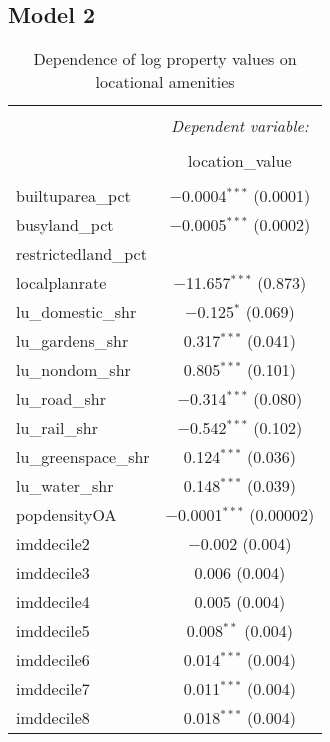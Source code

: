 \documentclass{article}\usepackage[]{graphicx}\usepackage[]{color}
\begin{document}
\subsection{Model 2}\label{section:model 2}

\begin{table}[!htbp] \centering 
  \caption{Dependence of log property values on locational amenities } 
  \label{} 
\small 
\begin{tabular}{@{\extracolsep{5pt}}lc} 
\\[-1.8ex]\hline 
\hline \\[-1.8ex] 
 & \multicolumn{1}{c}{\textit{Dependent variable:}} \\ 
\cline{2-2} 
\\[-1.8ex] & location\_value \\ 
\hline \\[-1.8ex] 
 builtuparea\_pct & $-$0.0004$^{***}$ (0.0001) \\ 
  busyland\_pct & $-$0.0005$^{***}$ (0.0002) \\ 
  restrictedland\_pct &  \\ 
  localplanrate & $-$11.657$^{***}$ (0.873) \\ 
  lu\_domestic\_shr & $-$0.125$^{*}$ (0.069) \\ 
  lu\_gardens\_shr & 0.317$^{***}$ (0.041) \\ 
  lu\_nondom\_shr & 0.805$^{***}$ (0.101) \\ 
  lu\_road\_shr & $-$0.314$^{***}$ (0.080) \\ 
  lu\_rail\_shr & $-$0.542$^{***}$ (0.102) \\ 
  lu\_greenspace\_shr & 0.124$^{***}$ (0.036) \\ 
  lu\_water\_shr & 0.148$^{***}$ (0.039) \\ 
  popdensityOA & $-$0.0001$^{***}$ (0.00002) \\ 
  imddecile2 & $-$0.002 (0.004) \\ 
  imddecile3 & 0.006 (0.004) \\ 
  imddecile4 & 0.005 (0.004) \\ 
  imddecile5 & 0.008$^{**}$ (0.004) \\ 
  imddecile6 & 0.014$^{***}$ (0.004) \\ 
  imddecile7 & 0.011$^{***}$ (0.004) \\ 
  imddecile8 & 0.018$^{***}$ (0.004) \\ 

\end{tabular}
\end{table}
\end{document}
